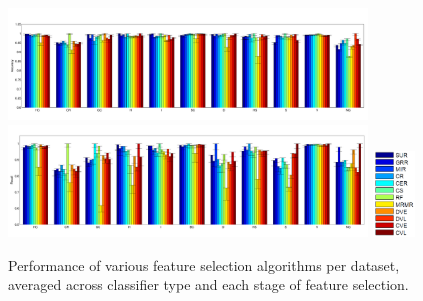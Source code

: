 \begin{figure}[tbp!]
\includegraphics[width=0.85\textwidth]{./figures/dataset_perf/Accuracy.pdf}\\
\includegraphics[width=0.85\textwidth]{./figures/dataset_perf/Recall.pdf}
\includegraphics[width=0.10\textwidth]{./figures/dataset_perf/legend.PNG}
\caption{\footnotesize Performance of various feature selection algorithms per dataset, averaged across classifier type and each stage of feature selection.}
\label{fig:perf_vs_dataset}
\end{figure}

